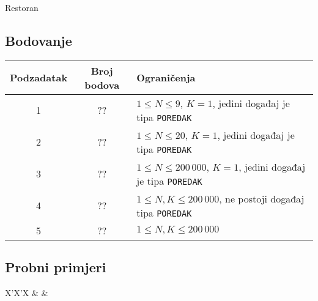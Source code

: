 \begin{statement}[
  problempoints=100,
  timelimit=1 sekunda,
  memorylimit=512 MiB,
]{Restoran}
\subsection*{Bodovanje}
{\renewcommand{\arraystretch}{1.4}
  \setlength{\tabcolsep}{6pt}
  \begin{tabular}{ccl}
 Podzadatak & Broj bodova & Ograničenja \\ \midrule
  1 & ?? & $1 \le N \le 9$, $K = 1$, jedini događaj je tipa \texttt{POREDAK} \\
  2 & ?? & $1 \le N \le 20$, $K = 1$, jedini događaj je tipa \texttt{POREDAK} \\
  3 & ?? & $1 \le N \le 200\,000$, $K = 1$, jedini događaj je tipa \texttt{POREDAK} \\
  4 & ?? & $1 \le N, K \le 200\,000$, ne postoji događaj tipa \texttt{POREDAK} \\
  5 & ?? & $1 \le N, K \le 200\,000$  \\
\end{tabular}}

\subsection*{Probni primjeri}
\begin{tabularx}{\textwidth}{X'X'X}
 &
 &
\end{tabularx}


\end{statement}

